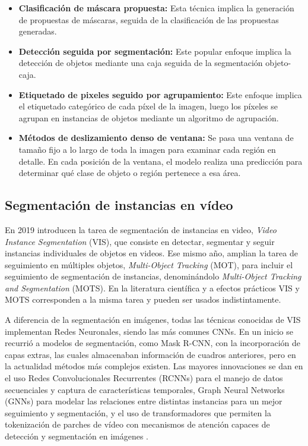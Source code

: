 \begin{itemize}
\setlength\itemsep{-0.3em}
    \item \textbf{Clasificación de máscara propuesta:} Esta técnica implica la generación de propuestas de máscaras, seguida de la clasificación de las propuestas generadas.
    \item \textbf{Detección seguida por segmentación:} Este popular enfoque implica la detección de objetos mediante una caja seguida de la segmentación objeto-caja.
    \item \textbf{Etiquetado de pixeles seguido por agrupamiento:} Este enfoque implica el etiquetado categórico de cada píxel de la imagen, luego los píxeles se agrupan en instancias de objetos mediante un algoritmo de agrupación.
    \item \textbf{Métodos de deslizamiento denso de ventana:} Se pasa una ventana de tamaño fijo a lo largo de toda la imagen para examinar cada región en detalle. En cada posición de la ventana, el modelo realiza una predicción para determinar qué clase de objeto o región pertenece a esa área.
\end{itemize}

\subsection{Segmentación de instancias en vídeo}
En 2019 \cite[Yang et al]{Yang2019} introducen la tarea de segmentación de instancias en video, \textit{Video Instance Segmentation} (VIS), que consiste en detectar, segmentar y seguir instancias individuales de objetos en videos. Ese mismo año, \cite[Voigtlaender et al.]{Voigtlaender2019} amplian la tarea de seguimiento en múltiples objetos, \textit{Multi-Object Tracking} (MOT), para incluir el seguimiento de segmentación de instancias, denominándolo \textit{Multi-Object Tracking and Segmentation} (MOTS). En la literatura científica y a efectos prácticos VIS y MOTS corresponden a la misma tarea y pueden ser usados indistintamente.

A diferencia de la segmentación en imágenes, todas las técnicas conocidas de VIS implementan Redes Neuronales, siendo las más comunes CNNs. En un inicio se recurrió a modelos de segmentación, como Mask R-CNN, con la incorporación de capas extras, las cuales almacenaban información de cuadros anteriores, pero en la actualidad métodos más complejos existen. Las mayores innovaciones se dan en el uso Redes Convolucionales Recurrentes (RCNNs) para el manejo de datos secuenciales y captura de características temporales, Graph Neural Networks (GNNs) para modelar las relaciones entre distintas instancias para un mejor seguimiento y segmentación, y el uso de transformadores que permiten la tokenización de parches de vídeo con mecanismos de atención capaces de detección y segmentación en imágenes \cite{Zhou2023}.

